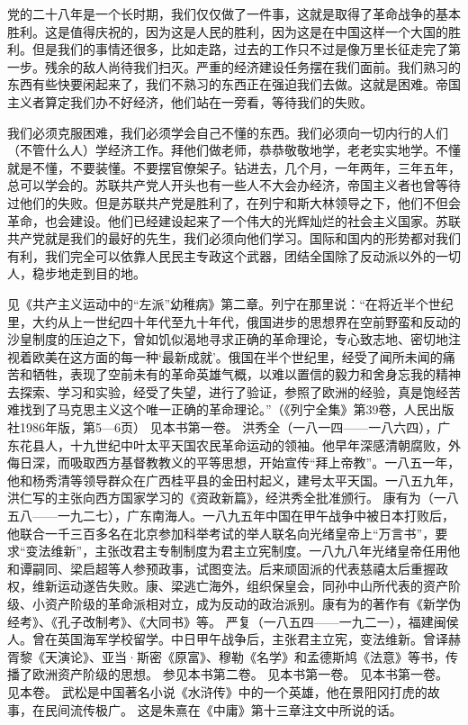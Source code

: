 党的二十八年是一个长时期，我们仅仅做了一件事，这就是取得了革命战争的基本胜利。这是值得庆祝的，因为这是人民的胜利，因为这是在中国这样一个大国的胜利。但是我们的事情还很多，比如走路，过去的工作只不过是像万里长征走完了第一步。残余的敌人尚待我们扫灭。严重的经济建设任务摆在我们面前。我们熟习的东西有些快要闲起来了，我们不熟习的东西正在强迫我们去做。这就是困难。帝国主义者算定我们办不好经济，他们站在一旁看，等待我们的失败。

我们必须克服困难，我们必须学会自己不懂的东西。我们必须向一切内行的人们（不管什么人）学经济工作。拜他们做老师，恭恭敬敬地学，老老实实地学。不懂就是不懂，不要装懂。不要摆官僚架子。钻进去，几个月，一年两年，三年五年，总可以学会的。苏联共产党人开头也有一些人不大会办经济，帝国主义者也曾等待过他们的失败。但是苏联共产党是胜利了，在列宁和斯大林领导之下，他们不但会革命，也会建设。他们已经建设起来了一个伟大的光辉灿烂的社会主义国家。苏联共产党就是我们的最好的先生，我们必须向他们学习。国际和国内的形势都对我们有利，我们完全可以依靠人民民主专政这个武器，团结全国除了反动派以外的一切人，稳步地走到目的地。


\begin{maonote}
见《共产主义运动中的“左派”幼稚病》第二章。列宁在那里说：“在将近半个世纪里，大约从上一世纪四十年代至九十年代，俄国进步的思想界在空前野蛮和反动的沙皇制度的压迫之下，曾如饥似渴地寻求正确的革命理论，专心致志地、密切地注视着欧美在这方面的每一种‘最新成就’。俄国在半个世纪里，经受了闻所未闻的痛苦和牺牲，表现了空前未有的革命英雄气概，以难以置信的毅力和舍身忘我的精神去探索、学习和实验，经受了失望，进行了验证，参照了欧洲的经验，真是饱经苦难找到了马克思主义这个唯一正确的革命理论。”（《列宁全集》第39卷，人民出版社1986年版，第5—6页）
见本书第一卷。
洪秀全（一八一四——一八六四），广东花县人，十九世纪中叶太平天国农民革命运动的领袖。他早年深感清朝腐败，外侮日深，而吸取西方基督教教义的平等思想，开始宣传“拜上帝教”。一八五一年，他和杨秀清等领导群众在广西桂平县的金田村起义，建号太平天国。一八五九年，洪仁写的主张向西方国家学习的《资政新篇》，经洪秀全批准颁行。
康有为（一八五八——一九二七），广东南海人。一八九五年中国在甲午战争中被日本打败后，他联合一千三百多名在北京参加科举考试的举人联名向光绪皇帝上“万言书”，要求“变法维新”，主张改君主专制制度为君主立宪制度。一八九八年光绪皇帝任用他和谭嗣同、梁启超等人参预政事，试图变法。后来顽固派的代表慈禧太后重握政权，维新运动遂告失败。康、梁逃亡海外，组织保皇会，同孙中山所代表的资产阶级、小资产阶级的革命派相对立，成为反动的政治派别。康有为的著作有《新学伪经考》、《孔子改制考》、《大同书》等。
严复（一八五四——一九二一），福建闽侯人。曾在英国海军学校留学。中日甲午战争后，主张君主立宪，变法维新。曾译赫胥黎《天演论》、亚当·斯密《原富》、穆勒《名学》和孟德斯鸠《法意》等书，传播了欧洲资产阶级的思想。
参见本书第二卷。
见本书第一卷。
见本书第一卷。
见本卷。
武松是中国著名小说《水浒传》中的一个英雄，他在景阳冈打虎的故事，在民间流传极广。
这是朱熹在《中庸》第十三章注文中所说的话。
\end{maonote}

